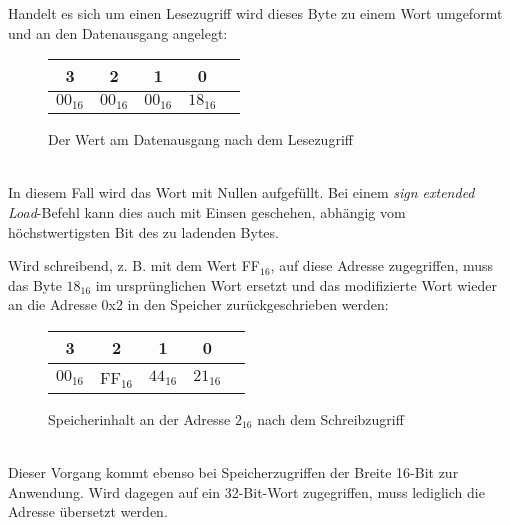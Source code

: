 Handelt es sich um einen Lesezugriff wird dieses Byte zu einem Wort umgeformt und an den Datenausgang angelegt:\\
\begin{figure} [htpb]
    \centering
        \begin{tabular}{|c|c|c|c|c|}
            \multicolumn{1}{c}{3} & \multicolumn{1}{c}{2} &  \multicolumn{1}{c}{1}& \multicolumn{1}{c}{0}\\
            \hline
            $00_{16}$ & $00_{16}$ & $00_{16}$ & $18_{16}$\\
            \hline
        \end{tabular}
        \caption{Der Wert am Datenausgang nach dem Lesezugriff}
\end{figure}\\
In diesem Fall wird das Wort mit Nullen aufgefüllt. 
Bei einem \textit{sign extended Load}-Befehl kann dies auch mit Einsen geschehen, abhängig vom höchstwertigsten Bit des zu ladenden Bytes.

Wird schreibend, z. B. mit dem Wert FF$_{16}$,  auf diese Adresse zugegriffen, muss das Byte $18_{16}$ im ursprünglichen Wort ersetzt und das modifizierte Wort wieder an die Adresse 0x2 in den Speicher zurückgeschrieben werden:
\begin{figure} [htpb]
    \centering
        \begin{tabular}{|c|c|c|c|c|}
            \multicolumn{1}{c}{3} & \multicolumn{1}{c}{2} &  \multicolumn{1}{c}{1}& \multicolumn{1}{c}{0}\\
            \hline
            $00_{16}$ & FF$_{16}$ & $44_{16}$ & $21_{16}$\\
            \hline
        \end{tabular}
        \caption{Speicherinhalt an der Adresse $2_{16}$ nach dem Schreibzugriff}
\end{figure}\\
Dieser Vorgang kommt ebenso bei Speicherzugriffen der Breite 16-Bit zur Anwendung.
Wird dagegen auf ein 32-Bit-Wort zugegriffen, muss lediglich die Adresse übersetzt werden.



